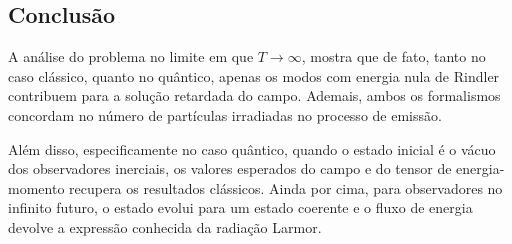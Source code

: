 \documentclass[10pt]{article}
\begin{document}
\begin{multicols*}{2}
    \section*{Conclusão}
    A análise do problema no limite em que \(T\to\infty\), mostra que de fato, tanto no caso clássico, quanto no quântico, apenas os modos com energia nula de Rindler contribuem para a solução retardada do campo. Ademais, ambos os formalismos concordam no número de partículas irradiadas no processo de emissão.

    Além disso, especificamente no caso quântico, quando o estado inicial é o vácuo dos observadores inerciais, os valores esperados do campo e do tensor de energia-momento recupera os resultados clássicos. Ainda por cima, para observadores no infinito futuro, o estado evolui para um estado coerente e o fluxo de energia devolve a expressão conhecida da radiação Larmor.

    
    
\end{multicols*}
\end{document}
